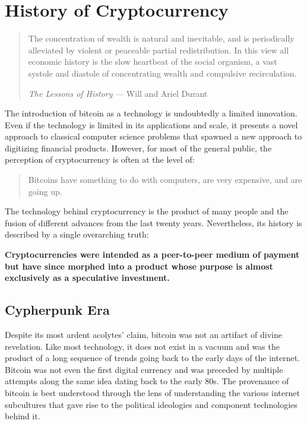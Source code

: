 \chapter{History of Cryptocurrency}

\begin{quote}
The concentration of wealth is natural and inevitable, and is periodically
alleviated by violent or peaceable partial redistribution. In this view all
economic history is the slow heartbeat of the social organism, a vast systole
and diastole of concentrating wealth and compulsive recirculation.
\begin{flushright}
  \textit{The Lessons of History} --- Will and Ariel Durant
\end{flushright}
\end{quote}


The introduction of bitcoin as a technology is undoubtedly a limited innovation.
Even if the technology is limited in its applications and scale, it presents a
novel approach to classical computer science problems that spawned a new
approach to digitizing financial products. However, for most of the general
public, the perception of cryptocurrency is often at the level of:

\begin{quote}
Bitcoins have something to do with computers, are very expensive, and are going up.
\end{quote}

The technology behind cryptocurrency is the product of many people and the
fusion of different advances from the last twenty years. Nevertheless, its
history is described by a single overarching truth:

\begin{infobox}
 \textbf{
    Cryptocurrencies were intended as a peer-to-peer medium of payment but have
    since morphed into a product whose purpose is almost exclusively as a
    speculative investment.
  }
\end{infobox}

\section{Cypherpunk Era}

Despite its most ardent acolytes' claim, bitcoin was not an artifact of divine
revelation. Like most technology, it does not exist in a vacuum and was the
product of a long sequence of trends going back to the early days of the
internet. Bitcoin was not even the first digital currency and was preceded by
multiple attempts along the same idea dating back to the early 80s. The
provenance of bitcoin is best understood through the lens of understanding the
various internet subcultures that gave rise to the political ideologies and
component technologies behind it.


